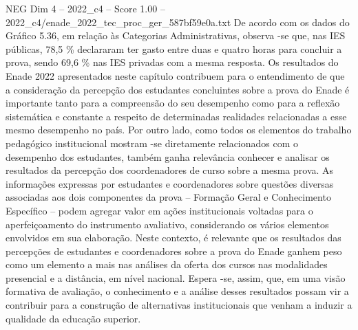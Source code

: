 \begin{textsample}{NEG Dim 4 – 2022\_c4 – Score 1.00 – 2022\_c4/enade\_2022\_tec\_proc\_ger\_587bf59e0a.txt}
De acordo com os dados do Gráfico 5.36, em relação às Categorias Administrativas, observa -se que, nas IES públicas, 78,5 \% declararam ter gasto entre duas e quatro horas para concluir a prova, sendo 69,6 \% nas IES privadas com a mesma resposta.
Os resultados do Enade 2022 apresentados neste capítulo contribuem para o entendimento de que a consideração da percepção dos estudantes concluintes sobre a prova do Enade é importante tanto para a compreensão do seu desempenho como para a reflexão sistemática e constante a respeito de determinadas realidades relacionadas a esse mesmo desempenho no país.
Por outro lado, como todos os elementos do trabalho pedagógico institucional mostram -se diretamente relacionados com o desempenho dos estudantes, também ganha relevância conhecer e analisar os resultados da percepção dos coordenadores de curso sobre a mesma prova.
As informações expressas por estudantes e coordenadores sobre questões diversas associadas aos dois componentes da prova – Formação Geral e Conhecimento Específico – podem agregar valor em ações institucionais voltadas para o aperfeiçoamento do instrumento avaliativo, considerando os vários elementos envolvidos em sua elaboração.
Neste contexto, é relevante que os resultados das percepções de estudantes e coordenadores sobre a prova do Enade ganhem peso como um elemento a mais nas análises da oferta dos cursos nas modalidades presencial e a distância, em nível nacional.
Espera -se, assim, que, em uma visão formativa de avaliação, o conhecimento e a análise desses resultados possam vir a contribuir para a construção de alternativas institucionais que venham a induzir a qualidade da educação superior.

\end{textsample}
